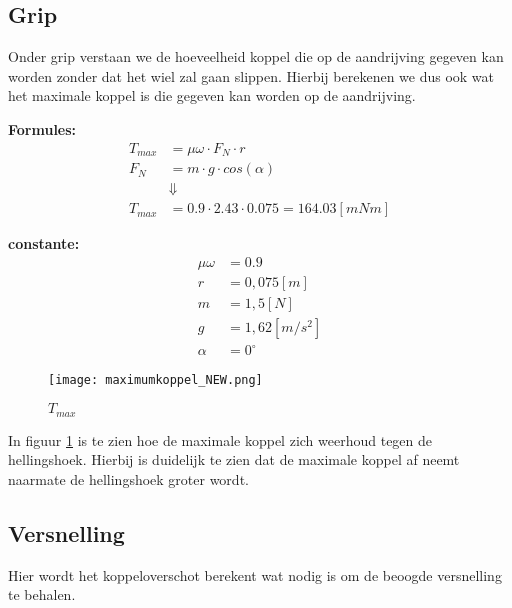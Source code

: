 \subsection{Grip}
    Onder grip verstaan we de hoeveelheid koppel die op de aandrijving gegeven kan worden zonder dat het wiel zal gaan slippen. Hierbij berekenen we dus ook wat het maximale koppel is die gegeven kan worden op de aandrijving.

    \begin{multicols}{2}
        \textbf{Formules:}
        \begin{equation}
            \begin{split}
                T_{max} &= \mu \omega \cdot F_{N} \cdot r \\
                F_{N} &= m \cdot g \cdot cos(\alpha) \\
                &\Downarrow \\
                T_{max} &= 0.9 \cdot 2.43 \cdot 0.075 = 164.03 [mNm]
            \end{split}
        \end{equation}

        \textbf{constante:}
        \begin{equation*}
            \begin{split}
                \mu \omega &= 0.9 \\
                r &= 0,075 [m] \\
                m &= 1,5 [N] \\
                g &= 1,62 [m/s^2] \\
                \alpha &= 0^\circ 
            \end{split}
        \end{equation*}
    \end{multicols}

    \begin{figure}[H]
        \centering
        \texttt{[image: maximumkoppel\_NEW.png]}
        \caption{$T_{max}$}
        \label{fig:peanut}
    \end{figure}

    In figuur \ref{fig:peanut} is te zien hoe de maximale koppel zich weerhoud tegen de hellingshoek. Hierbij is duidelijk te zien dat de maximale koppel af neemt naarmate de hellingshoek groter wordt.

\subsection{Versnelling}
    Hier wordt het koppeloverschot berekent wat nodig is om de beoogde versnelling te behalen. 

